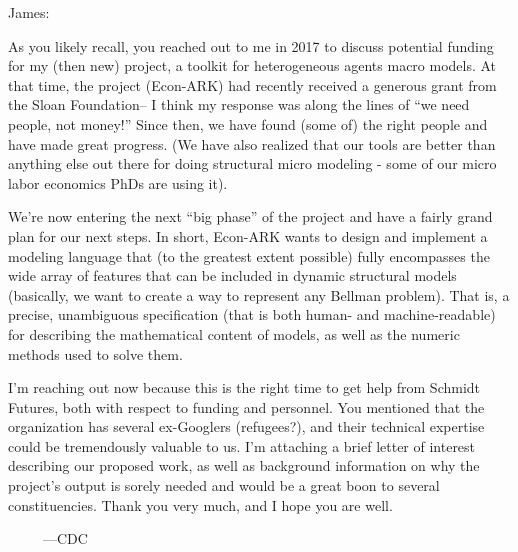 \documentclass[12pt,pdftex,letterpaper]{article}
\begin{document}
	\pagestyle{empty}
	
James:

As you likely recall, you reached out to me in 2017 to discuss potential funding for my (then new) project, a toolkit for heterogeneous agents macro models. At that time, the project (Econ-ARK) had recently received a generous grant from the Sloan Foundation-- I think my response was along the lines of ``we need people, not money!'' Since then, we have found (some of) the right people and have made great progress.  (We have also realized that our tools are better than anything else out there for doing structural micro modeling - some of our micro labor economics PhDs are using it).

We're now entering the next ``big phase'' of the project and have a fairly grand plan for our next steps. In short, Econ-ARK wants to design and implement a modeling language that (to the greatest extent possible) fully encompasses the wide array of features that can be included in dynamic structural models (basically, we want to create a way to represent any Bellman problem).  That is, a precise, unambiguous specification (that is both human- and machine-readable) for describing the mathematical content of models, as well as the numeric methods used to solve them. %

I'm reaching out now because this is the right time to get help from Schmidt Futures, both with respect to funding and personnel. You mentioned that the organization has several ex-Googlers (refugees?), and their technical expertise could be tremendously valuable to us. I'm attaching a brief letter of interest describing our proposed work, as well as background information on why the project's output is sorely needed and would be a great boon to several constituencies. Thank you very much, and I hope you are well.

~~~~~---CDC
\end{document}
